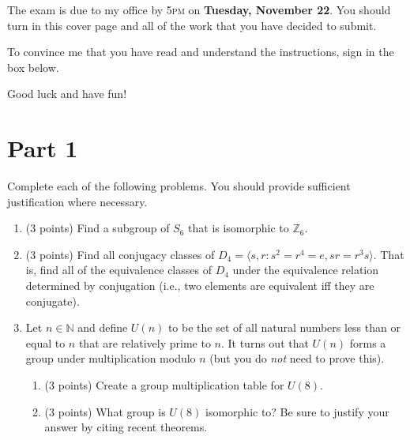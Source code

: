 \documentclass[11pt]{article}
\theoremstyle{definition}
\begin{document}
The exam is due to my office by 5\textsc{pm} on \textbf{Tuesday, November 22}.  You should turn in this cover page and all of the work that you have decided to submit.

\bigskip

To convince me that you have read and understand the instructions, sign in the box below.

\bigskip


\bigskip

Good luck and have fun!

\newpage

\section*{Part 1}

Complete each of the following problems.  You should provide sufficient justification where necessary.

\begin{enumerate}

\item (3 points) Find a subgroup of $S_6$ that is isomorphic to $\mathbb{Z}_6$.

\item (3 points) Find all conjugacy classes of $D_4=\langle s,r:s^2=r^4=e, sr=r^3s\rangle$.  That is, find all of the equivalence classes of $D_4$ under the equivalence relation determined by conjugation (i.e., two elements are equivalent iff they are conjugate).

\item Let $n\in \mathbb{N}$ and define $U(n)$ to be the set of all natural numbers less than or equal to $n$ that are relatively prime to $n$.  It turns out that $U(n)$ forms a group under multiplication modulo $n$ (but you do \emph{not} need to prove this).

\begin{enumerate}

\item (3 points) Create a group multiplication table for $U(8)$.

\item (3 points) What group is $U(8)$ isomorphic to?  Be sure to justify your answer by citing recent theorems.

\end{enumerate}

\end{enumerate}
\end{document}
